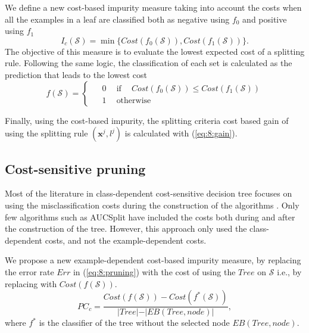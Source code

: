 		We define a new cost-based impurity measure taking into account the costs when all the examples
		in a leaf are classified both as negative using $f_0$ and positive using $f_1$
		\begin{equation}\label{eq:8:cost_impurity}
			I_c(\mathcal{S}) = \min \bigg\{ Cost(f_0(\mathcal{S})), Cost(f_1(\mathcal{S})) \bigg\}.
		\end{equation}
		The objective of this measure is to evaluate the lowest expected cost of a splitting rule.
		Following the same logic, the classification of each set is calculated as the prediction that 
		leads to the lowest cost
	  \begin{equation}\label{eq:8:pred}
	    f(\mathcal{S}) = 
	    \begin{cases}
	      \phantom{-}0 \phantom{-} \mbox{if} \phantom{-} Cost(f_0(\mathcal{S})) \le 
        Cost(f_1(\mathcal{S}))\\
	      \phantom{-}1 \phantom{-}\mbox{otherwise}
	    \end{cases}
	  \end{equation}

		Finally, using the cost-based impurity, the splitting criteria cost based gain of using the 
		splitting rule $(\mathbf{x}^j,l^j)$ is calculated with (\ref{eq:8:gain}). 

	\subsection{Cost-sensitive pruning}
 
		Most of the literature in class-dependent cost-sensitive decision tree focuses on using the 
		misclassification costs during the construction of the algorithms \citep{Lomax2013}. Only few 
		algorithms such as AUCSplit \citep{Ferri2002} have \mbox{included} the costs both during and 
		after the construction of the tree. However, this approach only used the class-dependent costs, 
		and not the example-dependent costs.
 
		We propose a new example-dependent cost-based impurity measure, by replacing the error rate 
		$Err$ in (\ref{eq:8:pruning}) with the cost of using the $Tree$ on $\mathcal{S}$ i.e., by 
    replacing with 	$Cost(f(\mathcal{S}))$.
		\begin{equation}\label{eq:8:cost_pruning}
			PC_{c} = \frac{ Cost(f(\mathcal{S})) - Cost(f^*(\mathcal{S})) }
		  {\vert Tree\vert-\vert EB(Tree,node)\vert} ,
		\end{equation}
		where $f^*$ is the classifier of the tree without the selected node $EB(Tree,node)$.
 
